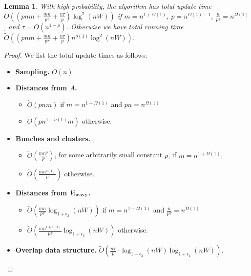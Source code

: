 \documentclass[11pt]{article}
\newtheorem{lemma}[theorem]{Lemma}
\theoremstyle{definition}
\theoremstyle{remark}
\begin{document}
\begin{lemma}\label{lm:mult_2W_time}
    With high probability, the algorithm \DynAPSPtwoW has total update time $ \tilde O ((pnm + \tfrac{m n }{p\tau}+\tfrac{n\tau}{ p})\log^2(nW)) $ if $m=n^{1+\Omega(1)}$, $p=n^{\Omega(1)-1}$, $\tfrac{n}{p\tau}=n^{\Omega(1)}$, and $\tau = O(n^{1-\rho})$. Otherwise we have total running time $ \tilde O ((pnm +\tfrac{m n }{p\tau} +\tfrac{n\tau}{ p})n^{o(1)}\log^2(nW)) $.
\end{lemma}
\begin{proof}
    We list the total update times as follows:
\begin{itemize}
    \item \textbf{Sampling.} $O(n)$
    \item \textbf{Distances from $A$.}
    \begin{itemize}
	\item $\tilde{O}(pnm)$ if $m=n^{1+\Omega(1)}$ and $pn=n^{\Omega(1)}$
	\item $\tilde O(pn^{1+o(1)}m)$ otherwise.
    \end{itemize}
    \item \textbf{Bunches and clusters.} 
    \begin{itemize}
	\item $ \tilde O (\tfrac{mn^\rho}{p}) $, for some arbitrarily small constant $\rho$, if $m=n^{1+\Omega(1)}$, 
	\item $\tilde O(\tfrac{mn^{o(1)}}{p})$ otherwise.
    \end{itemize}
    \item \textbf{Distances from $ V_{\rm{heavy}} $.}
    \begin{itemize}
	\item $ \tilde O (\tfrac{m n }{p\tau}\log_{1+\epsilon_3}(nW)) $ if $m=n^{1+\Omega(1)}$ and $\tfrac{n}{p\tau}=n^{\Omega(1)}$
	\item $ \tilde O (\tfrac{m n^{1+o(1)} }{p\tau}\log_{1+\epsilon_3}(nW)) $ otherwise.
    \end{itemize}
   \item \textbf{Overlap data structure.} $\tilde O (\tfrac{n\tau }{p} \cdot\log_{1+\epsilon_3}(nW)\log_{1+\epsilon_4}(nW)) $.
\end{itemize}


\end{proof}
\end{document}
